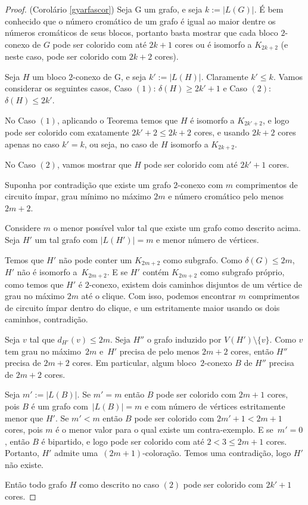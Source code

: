 \begin{proof}{(Corolário \ref{gyarfascor})}
Seja G um grafo, e seja $k := |L(G)|$. É bem conhecido que o número cromático de um grafo é igual ao maior dentre os números cromáticos de seus blocos, portanto basta mostrar que cada bloco $2$-conexo de $G$ pode ser colorido com até $2k+1$ cores ou é isomorfo a $K_{2k+2}$ (e neste caso, pode ser colorido com $2k+2$ cores).

Seja $H$ um bloco $2$-conexo de G, e seja $k' := |L(H)|$. Claramente $k' \leq k$. Vamos considerar os seguintes casos, Caso $(1)$: $\delta(H) \geq 2k'+1$ e Caso $(2)$: $\delta(H) \leq 2k'$.

No Caso $(1)$, aplicando o Teorema temos que $H$ é isomorfo a $K_{2k'+2}$, e logo pode ser colorido com exatamente $2k'+2\leq 2k+2$ cores, e usando $2k+2$ cores apenas no caso $k' = k$, ou seja, no caso de $H$  isomorfo a $K_{2k+2}$.

No Caso $(2)$, vamos mostrar que $H$ pode ser colorido com até $2k'+1$ cores.

Suponha por contradição que existe um grafo $2$-conexo com $m$ comprimentos de circuito ímpar, grau mínimo no máximo $2m$ e número cromático pelo menos $2m+2$.

Considere $m$ o menor possível valor tal que existe um grafo como descrito acima. Seja $H'$ um tal grafo com $|L(H')| = m$ e menor número de vértices.

Temos que $H'$ não pode conter um $K_{2m+2}$ como subgrafo. Como $\delta(G) \leq 2m$, $H'$ não é isomorfo a~$K_{2m+2}$. E se $H'$ contém $K_{2m+2}$ como subgrafo próprio, como temos que $H'$ é $2$-conexo, existem dois caminhos disjuntos de um vértice de grau no máximo $2m$ até o clique. Com isso, podemos encontrar $m$ comprimentos de circuito ímpar dentro do clique, e um estritamente maior usando os dois caminhos, contradição.

Seja $v$ tal que $d_{H'}(v) \le 2m$. Seja $H''$ o grafo induzido por $V(H') \setminus \{v\}$. Como $v$ tem grau no máximo~$2m$ e~$H'$ precisa de pelo menos $2m+2$ cores, então $H''$ precisa de $2m+2$ cores. Em particular, algum bloco~$2$-conexo $B$ de $H''$ precisa de $2m+2$ cores.

Seja $m' := |L(B)|$. Se $m' = m$ então $B$ pode ser colorido com $2m+1$ cores, pois $B$ é um grafo com~$|L(B)| = m$ e com número de vértices estritamente menor que $H'$. Se $m' < m$ então $B$ pode ser colorido com $2m'+1 < 2m+1$ cores, pois $m$ é o menor valor para o qual existe um contra-exemplo. E se~$m' = 0$, então $B$ é bipartido, e logo pode ser colorido com até $2 < 3 \leq 2m+1$ cores. Portanto, $H'$ admite uma~$(2m+1)$-coloração. Temos uma contradição, logo $H'$ não existe. 

Então todo grafo $H$ como descrito no caso $(2)$ pode ser colorido com $2k'+1$ cores.
\end{proof}

